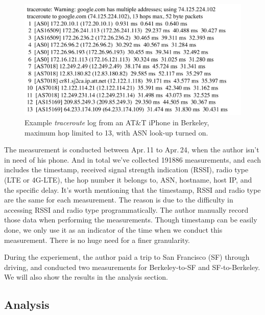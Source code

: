 \begin{figure}[!htb]
  \centering
  \includegraphics[width=1.1\linewidth]{../figs/traceroute.pdf}
  \vspace{-2em}
  \caption{Example {\it traceroute} log from an AT\&T iPhone in Berkeley, maximum hop limited to 13, with ASN look-up turned on.}
  \label{fig:traceroute}
\end{figure}


The measurement is conducted between Apr.\,11 to Apr.\,24, when the author isn't in need of his phone. And in total we've collected 191886 measurements, and each includes the timestamp, received signal strength indication (RSSI), radio type (LTE or 4G-LTE), the hop number it belongs to, ASN, hostname, host IP, and the specific delay. It's worth mentioning that the timestamp, RSSI and radio type are the same for each measurement. The reason is due to the difficulty in accessing RSSI and radio type programmatically. The author manually record those data when performing the measurements. Though timestamp can be easily done, we only use it as an indicator of the time when we conduct this measurement. There is no huge need for a finer granularity.

During the experiement, the author paid a trip to San Francisco (SF) through driving, and conducted two measurements for Berkeley-to-SF and SF-to-Berkeley. We will also show the results in the analysis section. 


\subsection{Analysis}
\label{sec:analysis}

